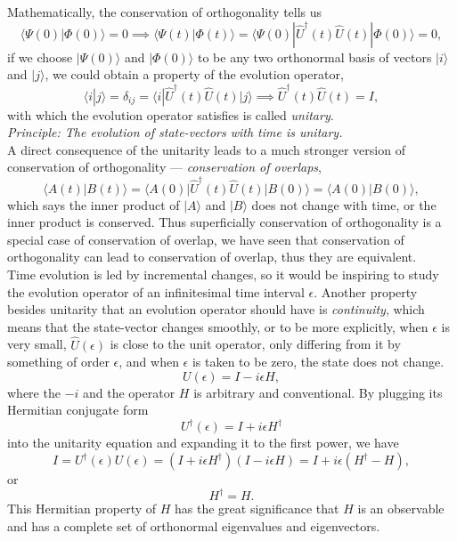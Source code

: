 \documentclass{article}
\newcommand{\be}{\begin{equation}}
\newcommand{\ee}{\end{equation}}
\newcommand{\1}{\left}
\newcommand{\2}{\right}
\newcommand{\la}{\langle}
\newcommand{\ra}{\rangle}
\newcommand{\ep}{\epsilon}
\begin{document}
Mathematically, the conservation of orthogonality tells us
\be
\la \Psi(0)|\Phi(0)\ra=0 \implies \la \Psi(t)|\Phi(t)\ra=\la \Psi(0)|\hat U^\dagger(t) \hat U(t)|\Phi(0)\ra=0,
\ee
if we choose $|\Psi(0)\ra$ and $|\Phi(0)\ra$ to be any two orthonormal basis of vectors $|i\ra$ and $|j\ra$, we could obtain a property of the evolution operator,
\be
\la i|j\ra =\delta_{ij} = \la i|\hat U^\dagger(t) \hat U(t)|j\ra \implies \hat U^\dagger(t) \hat U(t)=I,
\ee
with which the evolution operator satisfies is called \textit{unitary}.\\

\textit{Principle: The evolution of state-vectors with time is unitary.}\\

A direct consequence of the unitarity leads to a much stronger version of conservation of orthogonality --- \textit{conservation of overlaps},
\be
\la A(t)|B(t)\ra = \la A(0) |\hat U^\dagger(t)\hat U(t)|B(0)\ra = \la A(0)|B(0)\ra,
\ee
which says the inner product of $|A\ra$ and $|B\ra$ does not change with time, or the inner product is conserved. Thus superficially conservation of orthogonality is a special case of conservation of overlap, we have seen that conservation of orthogonality can lead to conservation of overlap, thus they are equivalent.\\

Time evolution is led by incremental changes, so it would be inspiring to study the evolution operator of an infinitesimal time interval $\epsilon$. Another property besides unitarity that an evolution operator should have is \textit{continuity}, which means that the state-vector changes smoothly, or to be more explicitly, when $\epsilon$ is very small, $\hat U(\epsilon)$ is close to the unit operator, only differing from it by something of order $\epsilon$, and when $\ep$ is taken to be zero, the state does not change. 
\be
U(\epsilon)=I-i\epsilon H,
\ee
where the $-i$ and the operator $H$ is arbitrary and conventional. By plugging its Hermitian conjugate form
\be
U^\dagger(\epsilon)=I+i\epsilon H^\dagger
\ee
into the unitarity equation and expanding it to the first power, we have
\be
I=U^\dagger(\epsilon)U(\epsilon)=(I+i\epsilon H^\dagger)(I-i\epsilon H)=I+i\epsilon (H^\dagger-H),
\ee
or
\be
H^\dagger=H.
\ee
This Hermitian property of  $H$ has the great significance that $H$ is an observable and has a complete set of orthonormal eigenvalues and eigenvectors.\\
\end{document}
